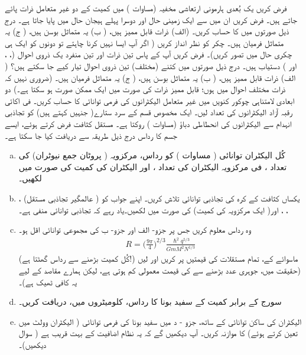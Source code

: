 فرض کریں یک بُعدی ہارمونی ارتعاشی مخفیہ (مساوات ) میں کمیت  کے دو غیر متعامل ذرات پائے جاتے ہیں۔ فرض کریں ان میں سے ایک زمینی حال اور دوسرا پہلے ہیجان حال میں پایا جاتا ہے۔ درج ذیل صورتوں میں  کا حساب کریں۔ (الف) ذرات قابل ممیز ہیں، ( ب) یہ متماثل بوسن ہیں، ( ج) یہ متماثل فرمیان ہیں۔ چکر کو نظر انداز کریں ( اگر آپ ایسا نہیں کرنا چاہتے تو دونوں کو ایک ہی چکری حال میں تصور کریں)۔ 
فرض کریں آپ کے پاس تین ذرات اور تین منفرد یک ذروی احوال (، ، اور ) دستیاب ہیں۔ درج ذیل صورتوں میں کتنے (مختلف) تین ذروی احوال تیار کیے جا سکتے ہیں؟ ( الف) ذرات قابل ممیز ہیں، ( ب) یہ متماثل بوسن ہیں، ( ج) یہ متماثل فرمیان ہیں۔ (ضروری نہیں کہ ذرات مختلف احوال میں ہوں؛ قابل ممیز ذرات کی صورت میں  ایک ممکن صورت ہو سکتا ہے۔)
دو ابعادی لامتناہی چوکور کنویں میں غیر متعامل الیکٹرانوں کی فرمی توانائی کا حساب کریں۔ فی اکائی رقبہ آزاد الیکٹرانوں کی تعداد  لیں۔
ایک مخصوص قسم کے سرد ستارے( جنہیں  کہتے ہیں) کو تجاذبی انہدام سے الیکٹرانوں کی انحطاطی دباؤ (مساوات ) روکتا ہے۔ مستقل کثافت فرض کرتے ہوئے، ایسے جسم کا رداس  درج ذیل طریقہ سے دریافت کیا جا سکتا ہے۔
\begin{enumerate}[a.]
\item
کُل الیکٹران توانائی ( مساوات ) کو رداس، مرکزویہ ( پروٹان جمع نیوٹران) کی تعداد ، فی مرکزویہ الیکٹران کی تعداد ، اور الیکٹران کی کمیت  کی صورت میں لکھیں۔ 
\item
 یکساں کثافت کے کرہ کی تجاذبی توانائی تلاش کریں۔ اپنے جواب کو ( عالمگیر تجاذبی مستقل) ، ، ، اور( ایک مرکزویہ کی کمیت)  کی صورت میں لکھیں۔یاد رہے کہ تجاذبی توانائی منفی ہے۔
\item
وہ رداس معلوم کریں جس پر جزو- الف اور جزو- ب کی مجموعی توانائی اقل ہو۔ 
\begin{align*}
R = \big ( \frac{9 \pi}{4} \big )^{2/3} \frac{\hslash^2 q^{5/3}}{GmM^2 N^{1/3}}
\end{align*}
(کُل کمیت بڑھنے سے رداس گھٹتا ہے!) ماسوائے  کے، تمام مستقلات کی قیمتیں پر کریں اور  لیں (حقیقت میں، جوہری عدد بڑھنے سے  کی قیمت معمولی کم ہوتی ہے، لیکن ہمارے مقاصد کے لیے یہ کافی ٹھیک ہے)۔  
 \item 
 سورج کے برابر کمیت کے سفید بونا کا رداس، کلومیٹروں میں، دریافت کریں۔ 
\item
الیکٹران کی ساکن توانائی کے ساتھ، جزو - د میں سفید بونا کی فرمی توانائی ( الیکٹران وولٹ میں تعین کرتے ہوئے) کا موازنہ کریں۔ آپ دیکھیں گے کہ یہ نظام اضافیت کے بہت قریب ہے ( سوال  دیکھیں)۔
\end{enumerate}
